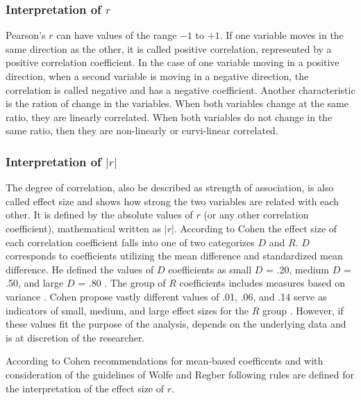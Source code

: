\documentclass[a4paper,12pt]{report}
\begin{document}
\subsubsection{Interpretation of $r$}
Pearson's $r$ can have values of the range $-1$ to $+1$. If one variable moves in the same direction as the other, it is called positive correlation, represented by a positive correlation coefficient. In the case of one variable moving in a positive direction, when a second variable is moving in a negative direction, the correlation is called negative and has a negative coefficient. Another characteristic is the ration of change in the variables. When both variables change at the same ratio, they are linearly correlated. When both variables do not change in the same ratio, then they are non-linearly or curvi-linear correlated. 

\subsubsection{Interpretation of $|r|$}
The degree of correlation, also be described as strength of association, is also called effect size and shows how strong the two variables are related with each other. It is defined by the absolute values of $r$ (or any other correlation coefficient), mathematical written as $|r|$. According to Cohen \cite{Cohen1988} the effect size of each correlation coefficient falls into one of two categorizes $D$ and $R$. $D$ corresponds to coefficients utilizing the mean difference and standardized mean difference. He defined the values of $D$ coefficients as small $D$ = .20, medium $D$ = .50, and large $D$ = .80 \cite{Piegorsch2002}. The group of $R$ coefficients includes measures based on variance \cite{Walker2005}. Cohen propose vastly different values of .01, .06, and .14 serve as indicators of small, medium, and large effect sizes for the $R$ group \cite{Cohen1988}. However, if these values fit the purpose of the analysis, depends on the underlying data and is at discretion of the researcher.


According to Cohen recommendations for mean-based coefficents \cite{Cohen1988,Piegorsch2002,Walker2005} and with consideration of the guidelines of Wolfe \cite{Wolfe2017} and Regber \cite{Regber2016} following rules are defined for the interpretation of the effect size of $r$.
\end{document}
